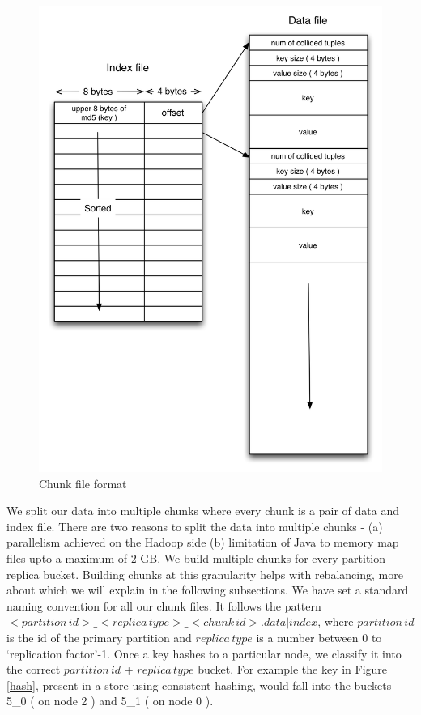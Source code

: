 \documentclass[10pt,twocolumn,preprint,natbib,authoryear]{sigplanconf}
\begin{document}
\begin{figure}
  \centering
    \includegraphics[scale=0.45]{storage_format.png}
  \caption{Chunk file format}
  \label{storage_format}
\end{figure}


We split our data into multiple chunks where every chunk is a pair of data and index file. There are two reasons to split the data into multiple chunks - (a) parallelism achieved on the Hadoop side (b) limitation of Java to memory map files upto a maximum of 2 GB. We build multiple chunks for every partition-replica bucket. Building chunks at this granularity helps with rebalancing, more about which we will explain in the following subsections. We have set a standard naming convention for all our chunk files. It follows the pattern $<partition\,id>\_<replica\,type>\_<chunk\,id>.data|index$, where $partition\,id$ is the id of the primary partition and $replica\,type$ is a number between 0 to `replication factor'-1. Once a key hashes to a particular node, we classify it into the correct $partition\,id$ + $replica\,type$ bucket. For example the key in Figure \ref{hash}, present in a store using consistent hashing, would fall into the buckets 5\_0 ( on node 2 ) and 5\_1 ( on node 0 ). 
\end{document}
